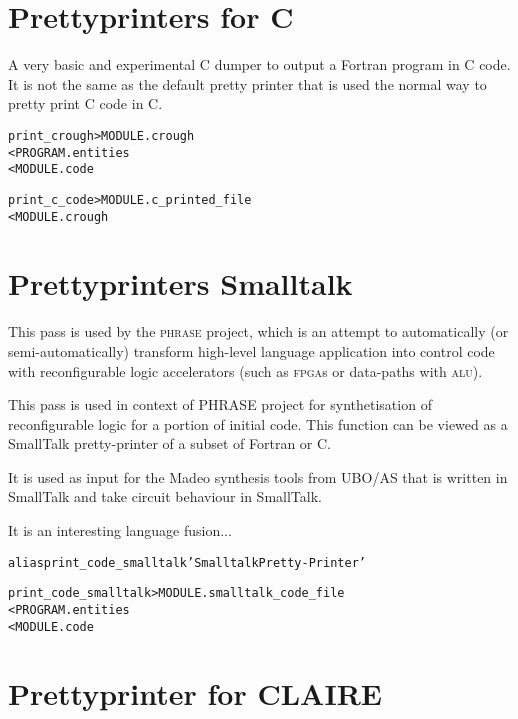 \documentclass[a4paper]{report}
\newenvironment{PipsMake}{\begin{alltt}}{\end{alltt}}
\begin{document}
\section{Prettyprinters for C}

A very basic and experimental C dumper to output a Fortran program in C
code. It is not the same as the default pretty printer that is used the
normal way to pretty print C code in C.

\begin{PipsMake}
print_crough  > MODULE.crough
              < PROGRAM.entities
              < MODULE.code

print_c_code  > MODULE.c_printed_file
              < MODULE.crough
\end{PipsMake}


\section{Prettyprinters Smalltalk}
\label{subsection-prettyprinters-smalltalk}

This pass is used by the \textsc{phrase} project, which is an attempt to
automatically (or semi-automatically) transform high-level language
application into control code with reconfigurable logic accelerators (such
as \textsc{fpga}s or data-paths with \textsc{alu}).

This pass is used in context of PHRASE project for synthetisation of
reconfigurable logic for a portion of initial code. This function can
be viewed as a SmallTalk pretty-printer of a subset of Fortran or C.

It is used as input for the Madeo synthesis tools from UBO/AS that is
written in SmallTalk and take circuit behaviour in SmallTalk.

It is an interesting language fusion...

\begin{PipsMake}
alias print_code_smalltalk 'Smalltalk Pretty-Printer'

print_code_smalltalk        > MODULE.smalltalk_code_file
        < PROGRAM.entities
        < MODULE.code
\end{PipsMake}


\section{Prettyprinter for CLAIRE}
\label{subsection-prettyprinter-claire}
\end{document}
